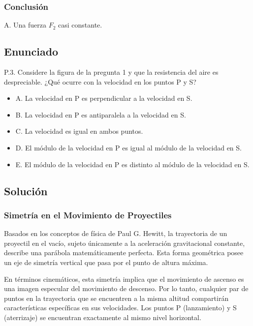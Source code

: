 \documentclass[12pt, a4paper]{article}
\begin{document}
\subsubsection*{Conclusión}

A. Una fuerza $F_2$ casi constante.

\newpage

\subsection*{Enunciado}

P.3. Considere la figura de la pregunta 1 y que la resistencia del aire es despreciable. ¿Qué ocurre con la velocidad en los puntos P y S?

\begin{itemize}
    \item A. La velocidad en P es perpendicular a la velocidad en S.
    \item B. La velocidad en P es antiparalela a la velocidad en S.
    \item C. La velocidad es igual en ambos puntos.
    \item D. El módulo de la velocidad en P es igual al módulo de la velocidad en S.
    \item E. El módulo de la velocidad en P es distinto al módulo de la velocidad en S.
\end{itemize}

\subsection*{Solución}

\subsubsection*{Simetría en el Movimiento de Proyectiles}

Basados en los conceptos de física de Paul G. Hewitt, la trayectoria de un proyectil en el vacío, sujeto únicamente a la aceleración gravitacional constante, describe una parábola matemáticamente perfecta. Esta forma geométrica posee un eje de simetría vertical que pasa por el punto de altura máxima. 

En términos cinemáticos, esta simetría implica que el movimiento de ascenso es una imagen especular del movimiento de descenso. Por lo tanto, cualquier par de puntos en la trayectoria que se encuentren a la misma altitud compartirán características específicas en sus velocidades. Los puntos P (lanzamiento) y S (aterrizaje) se encuentran exactamente al mismo nivel horizontal.
\end{document}
